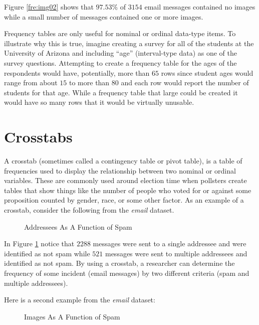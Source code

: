 Figure \ref{fre:img02} shows that $ 97.53\% $ of $ 3154 $ email messages contained no images while a small number of messages contained one or more images.

Frequency tables are only useful for nominal or ordinal data-type items. To illustrate why this is true, imagine creating a survey for all of the students at the University of Arizona and including ``age'' (interval-type data) as one of the survey questions. Attempting to create a frequency table for the ages of the respondents would have, potentially, more than $ 65 $ rows since student ages would range from about $ 15 $ to more than $ 80 $ and each row would report the number of students for that age. While a frequency table that large could be created it would have so many rows that it would be virtually unusable.

\section{Crosstabs}

A crosstab (sometimes called a contingency table or pivot table), is a table of frequencies used to display the relationship between two nominal or ordinal variables. These are commonly used around election time when pollsters create tables that show things like the number of people who voted for or against some proposition counted by gender, race, or some other factor. As an example of a crosstab, consider the following from the \textit{email} dataset.

\begin{figure}[H]
  \begin{center}
    \caption{Addressees As A Function of Spam}
    \label{fre:img03}
  \end{center}
\end{figure}

In Figure \ref{fre:img03} notice that $ 2288 $ messages were sent to a single addressee and were identified as not spam while $ 521 $ messages were sent to multiple addressees and identified as not spam. By using a crosstab, a researcher can determine the frequency of some incident (email messages) by two different criteria (spam and multiple addressees). 

Here is a second example from the \textit{email} dataset:

\begin{figure}[H]
  \begin{center}
    \caption{Images As A Function of Spam}
    \label{fre:img04}
  \end{center}
\end{figure}

